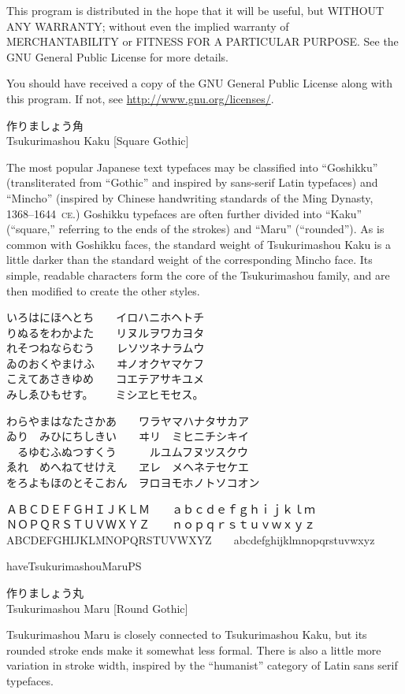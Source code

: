 \documentclass[14pt]{extarticle}
\newcommand{\iroha}{%
いろはにほへとち~~~~イロハニホヘトチ\\
りぬるをわかよた~~~~リヌルヲワカヨタ\\
れそつねならむう~~~~レソツネナラムウ\\
ゐのおくやまけふ~~~~ヰノオクヤマケフ\\
こえてあさきゆめ~~~~コエテアサキユメ\\
みしゑひもせす。~~~~ミシヱヒモセス。\par
}
\newcommand{\gojuuonzu}{%
わらやまはなたさかあ~~~~ワラヤマハナタサカア\\
ゐり~~みひにちしきい~~~~ヰリ~~ミヒニチシキイ\\
~~るゆむふぬつすくう~~~~~~ルユムフヌツスクウ\\
ゑれ~~めへねてせけえ~~~~ヱレ~~メヘネテセケエ\\
をろよもほのとそこおん~~ヲロヨモホノトソコオン\par
}
\begin{document}
This program is distributed in the hope that it will be useful,
but WITHOUT ANY WARRANTY; without even the implied warranty of
MERCHANTABILITY or FITNESS FOR A PARTICULAR PURPOSE.  See the
GNU General Public License for more details.

You should have received a copy of the GNU General Public License
along with this program.  If not, see \url{http://www.gnu.org/licenses/}.

\clearpage


\kaku

\Large
作りましょう角\\
Tsukurimashou Kaku [Square Gothic]

\normalsize

The most popular Japanese text typefaces may be classified into ``Goshikku''
(transliterated from ``Gothic'' and inspired by sans-serif Latin typefaces)
and ``Mincho'' (inspired by Chinese handwriting standards of the Ming
Dynasty, 1368--1644~\textsc{ce}.) Goshikku typefaces are often further
divided into ``Kaku'' (``square,'' referring to the ends of the strokes) and
``Maru'' (``rounded'').  As is common with Goshikku faces, the standard
weight of Tsukurimashou Kaku is a little darker than the standard weight of
the corresponding Mincho face.  Its simple, readable characters form the
core of the Tsukurimashou family, and are then modified to create the other
styles.

\kakumono
\iroha
\gojuuonzu

ＡＢＣＤＥＦＧＨＩＪＫＬＭ~~~~ａｂｃｄｅｆｇｈｉｊｋｌｍ\\
ＮＯＰＱＲＳＴＵＶＷＸＹＺ~~~~ｎｏｐｑｒｓｔｕｖｗｘｙｚ\\
ABCDEFGHIJKLMNOPQRSTUVWXYZ~~~~abcdefghijklmnopqrstuvwxyz

\clearpage


\expandafter\ifx\csname haveTsukurimashouMaruPS\endcsname\relax\else

\maru

\Large
作りましょう丸\\
Tsukurimashou Maru [Round Gothic]

\normalsize

Tsukurimashou Maru is closely connected to Tsukurimashou Kaku, but its
rounded stroke ends make it somewhat less formal. 
There is also a little more variation in stroke width, inspired by the
``humanist'' category of Latin sans serif typefaces.
\end{document}
